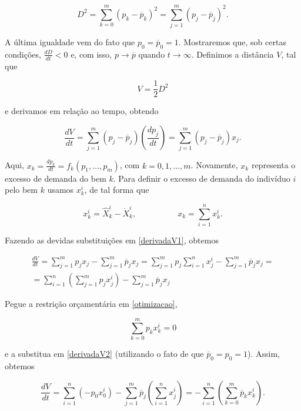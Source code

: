 \documentclass[
	12pt,				%
	openright,			%
	twoside,			%
	a4paper,			%
	english,			%
	french,				%
	spanish,			%
	brazil				%
	]{abntex2}
\newcommand{\espaco}{\hspace{5em}}
\newcommand{\pbarra}{\overline{p}}
\newcommand{\Xchapeuik}{\hat{X}^i_k}
\newcommand{\Xbolaik}{\mathring{X}^i_k}
\newcommand{\xik}{x^i_k}
\newcommand{\xij}{x^i_j}
\newcommand{\somamj}{\sum^m_{j=1}}
\newcommand{\somani}{\sum^n_{i=1}}
\begin{document}
\begin{equation}
	D^2 = \sum^m_{k=0}(p_k - \pbarra_k)^2 = \somamj(p_j - \pbarra_j)^2.
\end{equation}

A última igualdade vem do fato que $p_0 = \pbarra_0 = 1$. Mostraremos que, sob
certas condições, $\frac{dD}{dt} < 0$ e, com isso, $p \to \pbarra$ quando $t \to \infty$. Definimos a distância $V$, tal que

\begin{equation}
	V = \frac{1}{2}D^2
\end{equation}

e derivamos em relação ao tempo, obtendo

\begin{equation} \label{derivadaV1}
	\frac{dV}{dt} =  \somamj(p_j - \pbarra_j)(\frac{dp_j}{dt}) = \somamj(p_j - \pbarra_j)x_j.
\end{equation}

Aqui, $x_k = \frac{dp_k}{dt} = f_k(p_1, \ldots, p_m)$, com $k = 0, 1, \ldots,
m$. Novamente, $x_k$ representa o excesso de demanda do bem $k$. Para definir
o excesso de demanda do indivíduo $i$ pelo bem $k$ usamos $\xik$, de tal forma
que

\begin{equation}
	\xik = \Xchapeuik - \Xbolaik, \espaco x_k = \somani\xik.
\end{equation}

Fazendo as devidas substituições em \ref{derivadaV1}, obtemos

\begin{equation} \label{derivadaV2}
	\begin{aligned}
	\frac{dV}{dt} = \somamj p_jx_j - \somamj \pbarra_jx_j = \somamj p_j \somani \xij - \somamj \pbarra_jx_j = \\
	= \somani(\somamj p_j\xij) - \somamj \pbarra_jx_j
\end{aligned}
\end{equation}

Pegue a restrição orçamentária em \ref{otimizacao},

\begin{equation} \label{restricao}
	\sum^m_{k=0} p_k\xik = 0
\end{equation}

e a substitua em \ref{derivadaV2} (utilizando o fato de que $\pbarra_0 = p_0 = 1$). Assim, obtemos

\begin{equation}
	\frac{dV}{dt} = \somani(-p_0x^i_0) - \somamj\pbarra_j(\somani \xij) = - \somani(\sum^m_{k=0}\pbarra_k \xik).
\end{equation}
\end{document}

